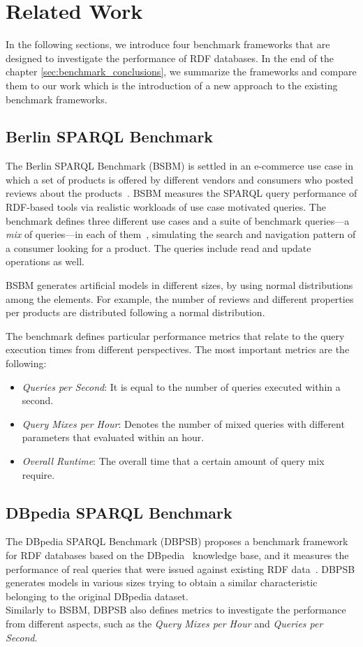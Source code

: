 \chapter{Related Work}

In the following sections, we introduce four benchmark frameworks that are designed to investigate the performance of RDF databases. In the end of the chapter \ref{sec:benchmark_conclusions}, we summarize the frameworks and compare them to our work which is the introduction of a new approach to the existing benchmark frameworks.

\section{Berlin SPARQL Benchmark}

The Berlin SPARQL Benchmark (BSBM) is settled in an e-commerce use case in which a set of products is offered by different vendors and consumers who posted reviews about the products~\cite{berlin}. BSBM measures the SPARQL query performance of RDF-based tools via realistic workloads of use case motivated queries. The benchmark defines three different use cases and a suite of benchmark queries---a \textit{mix} of queries---in each of them~\cite{berlin_specification}, simulating the search and navigation pattern of a consumer looking for a product. The queries include read and update operations as well.

BSBM generates artificial models in different sizes, by using normal distributions among the elements. For example, the number of reviews and different properties per products are distributed following a normal distribution.

The benchmark defines particular performance metrics that relate to the query execution times from different perspectives. The most important metrics are the following:
\begin{itemize}
	\item{\textit{Queries per Second}}: It is equal to the number of queries executed within a second.
	\item{\textit{Query Mixes per Hour}}: Denotes the number of mixed queries with different parameters that evaluated within an hour.
	\item{\textit{Overall Runtime}}: The overall time that a certain amount of query mix require.
\end{itemize}


\section{DBpedia SPARQL Benchmark}
The DBpedia SPARQL Benchmark (DBPSB) proposes a benchmark framework for RDF databases based on the DBpedia~\cite{dbpedia_data} knowledge base, and it measures the performance of real queries that were issued against existing RDF data~\cite{dbpedia}. DBPSB generates models in various sizes trying to obtain a similar characteristic belonging to the original DBpedia dataset.\\
Similarly to BSBM, DBPSB also defines metrics to investigate the performance from different aspects, such as the \textit{Query Mixes per Hour} and \textit{Queries per Second}. 

